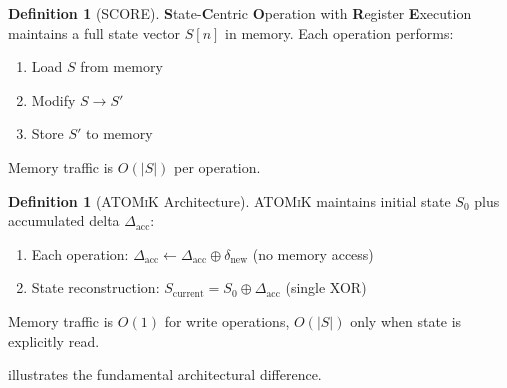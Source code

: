\documentclass[11pt,letterpaper]{article}
\theoremstyle{plain}
\theoremstyle{definition}
\newtheorem{definition}[theorem]{Definition}
\theoremstyle{remark}
\newcommand{\dcompose}{\oplus}
\newcommand{\atomik}{\textsc{ATOMiK}}
\newcommand{\score}{\textsc{SCORE}}
\begin{document}
\begin{definition}[\score{}]
\textbf{S}tate-\textbf{C}entric \textbf{O}peration with \textbf{R}egister \textbf{E}xecution maintains a full state vector $S[n]$ in memory. Each operation performs:
\begin{enumerate}
    \item Load $S$ from memory
    \item Modify $S \rightarrow S'$
    \item Store $S'$ to memory
\end{enumerate}
Memory traffic is $O(|S|)$ per operation.
\end{definition}

\begin{definition}[\atomik{} Architecture]
\atomik{} maintains initial state $S_0$ plus accumulated delta $\Delta_{\text{acc}}$:
\begin{enumerate}
    \item Each operation: $\Delta_{\text{acc}} \leftarrow \Delta_{\text{acc}} \dcompose \delta_{\text{new}}$ (no memory access)
    \item State reconstruction: $S_{\text{current}} = S_0 \oplus \Delta_{\text{acc}}$ (single XOR)
\end{enumerate}
Memory traffic is $O(1)$ for write operations, $O(|S|)$ only when state is explicitly read.
\end{definition}

 illustrates the fundamental architectural difference.
\end{document}

